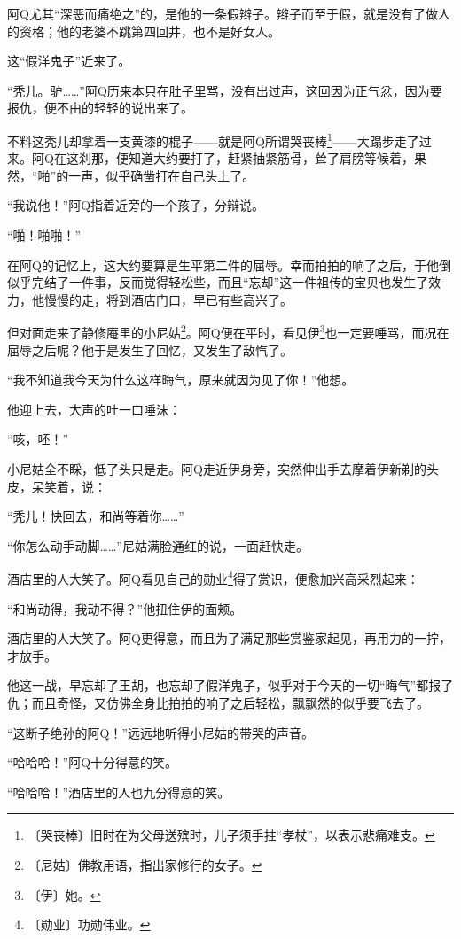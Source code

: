 \documentclass[12pt,UTF-8,openany]{ctexbook}
\begin{document}
\begin{large}
    阿Q尤其“深恶而痛绝之”的，是他的一条假辫子。辫子而至于假，就是没有了做人的资格；他的老婆不跳第四回井，也不是好女人。
    
    这“假洋鬼子”近来了。
    
    “秃儿。驴……”阿Q历来本只在肚子里骂，没有出过声，这回因为正气忿，因为要报仇，便不由的轻轻的说出来了。
    
    不料这秃儿却拿着一支黄漆的棍子——就是阿Q所谓哭丧棒\footnote{〔哭丧棒〕旧时在为父母送殡时，儿子须手拄“孝杖”，以表示悲痛难支。}——大蹋步走了过来。阿Q在这刹那，便知道大约要打了，赶紧抽紧筋骨，耸了肩膀等候着，果然，“啪”的一声，似乎确凿打在自己头上了。
    
    “我说他！”阿Q指着近旁的一个孩子，分辩说。
    
    “啪！啪啪！”
    
    在阿Q的记忆上，这大约要算是生平第二件的屈辱。幸而拍拍的响了之后，于他倒似乎完结了一件事，反而觉得轻松些，而且“忘却”这一件祖传的宝贝也发生了效力，他慢慢的走，将到酒店门口，早已有些高兴了。
    
    但对面走来了静修庵里的小尼姑\footnote{〔尼姑〕佛教用语，指出家修行的女子。}。阿Q便在平时，看见伊\footnote{〔伊〕她。}也一定要唾骂，而况在屈辱之后呢？他于是发生了回忆，又发生了敌忾了。
    
    “我不知道我今天为什么这样晦气，原来就因为见了你！”他想。
    
    他迎上去，大声的吐一口唾沫：
    
    “咳，呸！”
    
    小尼姑全不睬，低了头只是走。阿Q走近伊身旁，突然伸出手去摩着伊新剃的头皮，呆笑着，说：
    
    “秃儿！快回去，和尚等着你……”
    
    “你怎么动手动脚……”尼姑满脸通红的说，一面赶快走。
    
    酒店里的人大笑了。阿Q看见自己的勋业\footnote{〔勋业〕功勋伟业。}得了赏识，便愈加兴高采烈起来：
    
    “和尚动得，我动不得？”他扭住伊的面颊。
    
    酒店里的人大笑了。阿Q更得意，而且为了满足那些赏鉴家起见，再用力的一拧，才放手。
    
    他这一战，早忘却了王胡，也忘却了假洋鬼子，似乎对于今天的一切“晦气”都报了仇；而且奇怪，又仿佛全身比拍拍的响了之后轻松，飘飘然的似乎要飞去了。
    
    “这断子绝孙的阿Q！”远远地听得小尼姑的带哭的声音。
    
    “哈哈哈！”阿Q十分得意的笑。
    
    “哈哈哈！”酒店里的人也九分得意的笑。
    
\end{large}
\end{document}
